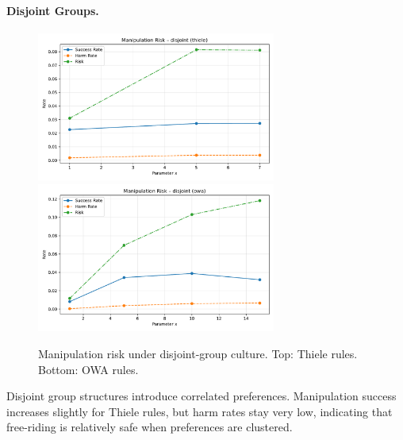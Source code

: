 \documentclass[11pt]{article}
\begin{document}
\paragraph{Disjoint Groups.}
\begin{figure}[h!]
\centering
\includegraphics[width=0.7\textwidth]{figures/risk_disjoint_thiele.pdf}
\includegraphics[width=0.7\textwidth]{figures/risk_disjoint_owa.pdf}
\caption{Manipulation risk under disjoint-group culture. Top: Thiele rules. Bottom: OWA rules.}
\end{figure}
Disjoint group structures introduce correlated preferences. Manipulation success
increases slightly for Thiele rules, but harm rates stay very low, indicating that
free-riding is relatively safe when preferences are clustered.
\end{document}
